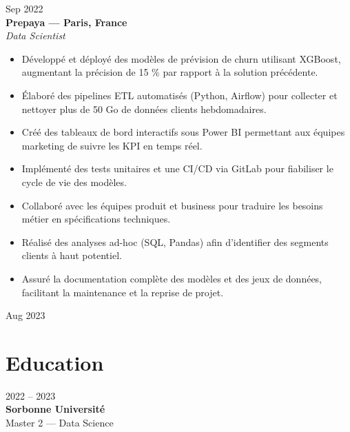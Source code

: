 \documentclass[10pt,letterpaper]{article}
\begin{document}
\begin{paracol}{2}
\begin{rightcolumn}
\begin{tcolorbox}
  \begin{minipage}[t]{0.48\linewidth}
    Sep 2022\\
    \textbf{Prepaya — Paris, France}\\
    \textit{Data Scientist}
    \begin{itemize}
      \item Développé et déployé des modèles de prévision de churn utilisant XGBoost, augmentant la précision de 15 \% par rapport à la solution précédente.
      \item Élaboré des pipelines ETL automatisés (Python, Airflow) pour collecter et nettoyer plus de 50 Go de données clients hebdomadaires.
      \item Créé des tableaux de bord interactifs sous Power BI permettant aux équipes marketing de suivre les KPI en temps réel.
      \item Implémenté des tests unitaires et une CI/CD via GitLab pour fiabiliser le cycle de vie des modèles.
      \item Collaboré avec les équipes produit et business pour traduire les besoins métier en spécifications techniques.
      \item Réalisé des analyses ad-hoc (SQL, Pandas) afin d’identifier des segments clients à haut potentiel.
      \item Assuré la documentation complète des modèles et des jeux de données, facilitant la maintenance et la reprise de projet.
    \end{itemize}
  \end{minipage}\hfill
  \begin{minipage}[t]{0.48\linewidth}
    \raggedleft
    Aug 2023
  \end{minipage}
\end{tcolorbox}

\vspace{0.9in}

\section*{Education}
\begin{tcolorbox}[colback=white,boxrule=1pt,colframe=primary]
  \begin{minipage}{0.47\linewidth}
    2022 – 2023\\
    \textbf{Sorbonne Université}\\
    Master 2 — Data Science
  \end{minipage}
\end{tcolorbox}


\end{rightcolumn}
\end{paracol}
\end{document}
